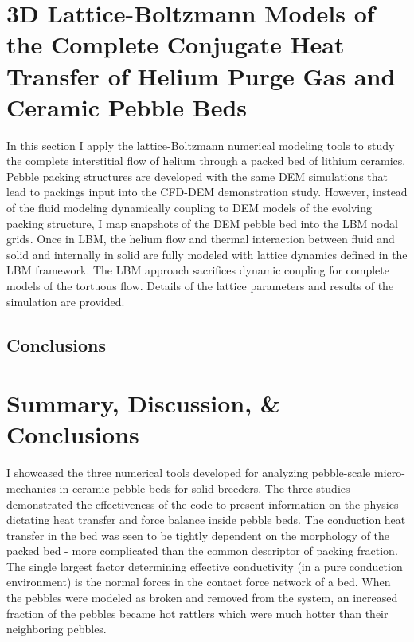 \section{3D Lattice-Boltzmann Models of the Complete Conjugate Heat Transfer of Helium Purge Gas and Ceramic Pebble Beds}\label{sec:lbm-studies}

In this section I apply the lattice-Boltzmann numerical modeling tools to study the complete interstitial flow of helium through a packed bed of lithium ceramics. Pebble packing structures are developed with the same DEM simulations that lead to packings input into the CFD-DEM demonstration study. However, instead of the fluid modeling dynamically coupling to DEM models of the evolving packing structure, I map snapshots of the DEM pebble bed into the LBM nodal grids. Once in LBM, the helium flow and thermal interaction between fluid and solid and internally in solid are fully modeled with lattice dynamics defined in the LBM framework. The LBM approach sacrifices dynamic coupling for complete models of the tortuous flow. Details of the lattice parameters and results of the simulation are provided.



\subsection{Conclusions}







\section{Summary, Discussion, \& Conclusions}

I showcased the three numerical tools developed for analyzing pebble-scale micro-mechanics in ceramic pebble beds for solid breeders. The three studies demonstrated the effectiveness of the code to present information on the physics dictating heat transfer and force balance inside pebble beds. The conduction heat transfer in the bed was seen to be tightly dependent on the morphology of the packed bed - more complicated than the common descriptor of packing fraction. The single largest factor determining effective conductivity (in a pure conduction environment) is the normal forces in the contact force network of a bed. When the pebbles were modeled as broken and removed from the system, an increased fraction of the pebbles became hot rattlers which were much hotter than their neighboring pebbles. 

